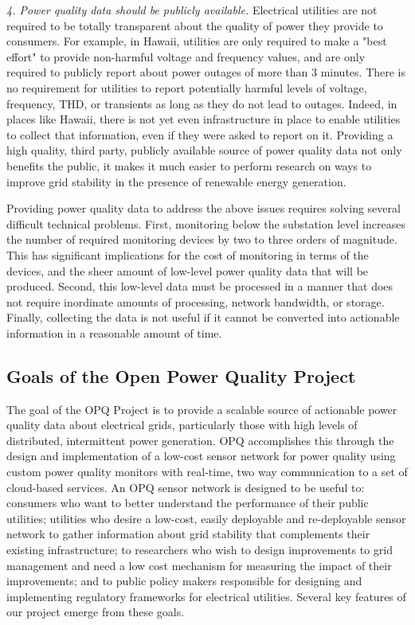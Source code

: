 {\em 4. Power quality data should be publicly available.} Electrical utilities are not required to be totally transparent about the quality of power they provide to consumers. For example, in Hawaii, utilities are only required to make a "best effort" to provide non-harmful voltage and frequency values, and are only required to publicly report about power outages of more than 3 minutes. There is no requirement for utilities to report potentially harmful levels of voltage, frequency, THD, or transients as long as they do not lead to outages. Indeed, in places like Hawaii, there is not yet even infrastructure in place to enable utilities to collect that information, even if they were asked to report on it.  Providing a high quality, third party, publicly available source of power quality data not only benefits the public, it makes it much easier to perform research on ways to improve grid stability in the presence of renewable energy generation.

Providing power quality data to address the above issues requires solving several difficult technical problems. First, monitoring below the substation level increases the number of required monitoring devices by two to three orders of magnitude. This has significant implications for the cost of monitoring in terms of the devices, and the sheer amount of low-level power quality data that will be produced. Second, this low-level data must be processed in a manner that does not require inordinate amounts of processing, network bandwidth, or storage. Finally, collecting the data is not useful if it cannot be converted into actionable information in a reasonable amount of time.

\subsection{Goals of the Open Power Quality Project}

The goal of the OPQ Project is to provide a scalable source of actionable power quality data about electrical grids, particularly those with high levels of distributed, intermittent power generation. OPQ accomplishes this through the design and implementation of a low-cost sensor network for power quality using custom power quality monitors with real-time, two way communication to a set of cloud-based services. An OPQ sensor network is designed to be useful to: consumers who want to better understand the performance of their public utilities; utilities who desire a low-cost, easily deployable and re-deployable sensor network to gather information about grid stability that complements their existing infrastructure; to researchers who wish to design improvements to grid management and need a low cost mechanism for measuring the impact of their improvements; and to public policy makers responsible for designing and implementing regulatory frameworks for electrical utilities.  Several key features of our project emerge from these goals.

